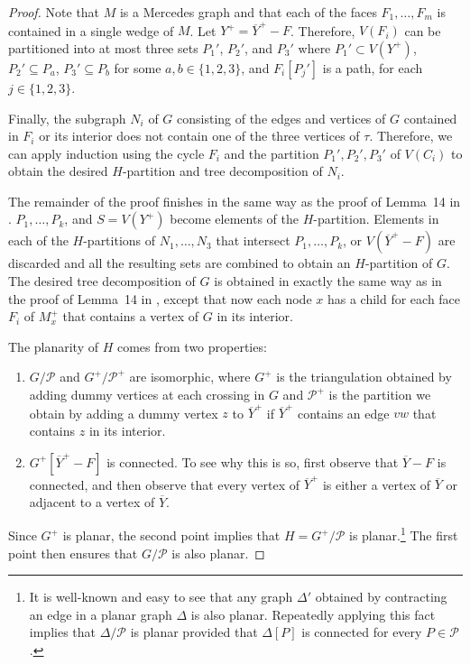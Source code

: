 \documentclass{patmorin}
\begin{document}
\begin{proof}
  Note that $M$ is a Mercedes graph and that each of the faces $F_1,\ldots,F_m$ is contained in a single wedge of $M$.   Let $Y^+ = \overline{Y}^+-F$. Therefore, $V(F_i)$ can be partitioned into at most three sets $P_1'$, $P_2'$, and $P_3'$ where $P_1'\subset V(Y^+)$, $P_2'\subseteq P_a$, $P_3'\subseteq P_b$ for some $a,b\in\{1,2,3\}$, and $F_i[P_j']$ is a path, for each $j\in\{1,2,3\}$. 

  Finally, the subgraph $N_i$ of $G$ consisting of the edges and vertices of $G$ contained in $F_i$ or its interior does not contain one of the three vertices of $\tau$. Therefore, we can apply induction using the cycle $F_i$ and the partition $P_1',P_2',P_3'$ of $V(C_i)$ to obtain the desired $H$-partition and tree decomposition of $N_i$.
  
  The remainder of the proof finishes in the same way as the proof of Lemma~14 in \cite{dujmovic.joret.ea:planar}.  $P_1,\ldots,P_k$, and $S=V(Y^+)$ become elements of the $H$-partition.  Elements in each of the $H$-partitions of $N_1,\ldots,N_3$ that intersect $P_1,\ldots,P_k$, or $V(\overline{Y}^+-F)$ are discarded and all the resulting sets are combined to obtain an $H$-partition of $G$.  The desired tree decomposition of $G$ is obtained in exactly the same way as in the proof of Lemma~14 in \cite{dujmovic.joret.ea:planar}, except that now each node $x$ has a child for each face $F_i$ of $M^+_x$ that contains a vertex of $G$ in its interior.
  
  The planarity of $H$ comes from two properties:
  \begin{enumerate}
    \item $G/\mathcal{P}$ and $G^+/\mathcal{P^+}$ are isomorphic, where $G^+$ is the triangulation obtained by adding dummy vertices at each crossing in $G$ and $\mathcal{P}^+$ is the partition we obtain by adding a dummy vertex $z$ to $\overline{Y}^+$ if $\overline{Y}^+$ contains an edge $vw$ that contains $z$ in its interior.  
    
    \item $G^+[\overline{Y}^+-F]$ is connected. To see why this is so, first observe that $\overline{Y}-F$ is connected, and then observe that every vertex of $\overline{Y}^+$ is either a vertex of $\overline{Y}$ or adjacent to a vertex of $\overline{Y}$.
  \end{enumerate}
  Since $G^+$ is planar, the second point implies that $H=G^+/\mathcal{P}$ is planar.\footnote{It is well-known and easy to see that any graph $\Delta'$ obtained by contracting an edge in a planar graph $\Delta$ is also planar.  Repeatedly applying this fact implies that $\Delta/\mathcal{P}$ is planar provided that $\Delta[P]$ is connected for every $P\in\mathcal{P}$.} The first point then ensures that $G/\mathcal{P}$ is also planar.
\end{proof}
\end{document}
